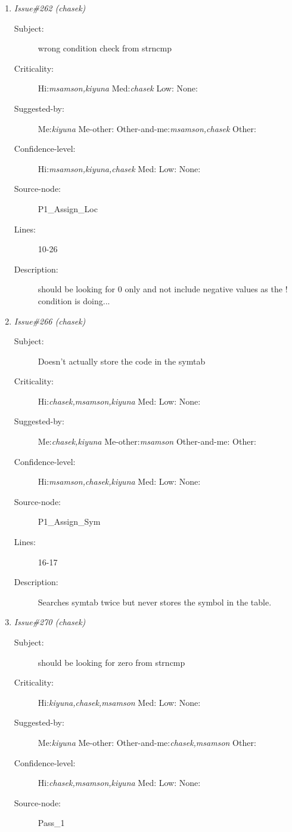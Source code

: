 \begin{enumerate}
\begin{description}
\item [Lines:] 23-31 23-27

\item [Description:] checks for a condition that is potentially
already false...
\end{description}
\item {\it Issue\#262 (chasek)}
\begin{description}
\item [Subject:] wrong condition check from strncmp
\item [Criticality:] Hi:{\it msamson,kiyuna} Med:{\it chasek} Low:{\it } None:{\it }
\item [Suggested-by:] Me:{\it kiyuna} Me-other:{\it } Other-and-me:{\it msamson,chasek} Other:{\it }
\item [Confidence-level:] Hi:{\it msamson,kiyuna,chasek} Med:{\it } Low:{\it } None:{\it }
\item [Source-node:] P1\_Assign\_Loc

\item [Lines:] 10-26

\item [Description:] should be looking for 0 only and not include
negative values as the ! condition is doing...
\end{description}
\item {\it Issue\#266 (chasek)}
\begin{description}
\item [Subject:] Doesn't actually store the code in the symtab
\item [Criticality:] Hi:{\it chasek,msamson,kiyuna} Med:{\it } Low:{\it } None:{\it }
\item [Suggested-by:] Me:{\it chasek,kiyuna} Me-other:{\it msamson} Other-and-me:{\it } Other:{\it }
\item [Confidence-level:] Hi:{\it msamson,chasek,kiyuna} Med:{\it } Low:{\it } None:{\it }
\item [Source-node:] P1\_Assign\_Sym

\item [Lines:] 16-17

\item [Description:] Searches symtab twice but never stores the
symbol in the table.
\end{description}
\item {\it Issue\#270 (chasek)}
\begin{description}
\item [Subject:] should be looking for zero from strncmp
\item [Criticality:] Hi:{\it kiyuna,chasek,msamson} Med:{\it } Low:{\it } None:{\it }
\item [Suggested-by:] Me:{\it kiyuna} Me-other:{\it } Other-and-me:{\it chasek,msamson} Other:{\it }
\item [Confidence-level:] Hi:{\it chasek,msamson,kiyuna} Med:{\it } Low:{\it } None:{\it }
\item [Source-node:] Pass\_1


\end{description}
\end{enumerate}
